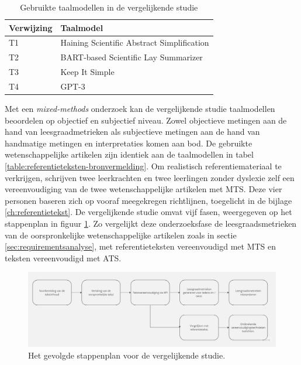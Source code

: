 \begin{center}
	\begin{table}[H]
		\begin{tabular}{ | m{4cm} | m{11cm} | } 
			\hline
			\textbf{Verwijzing} & \textbf{Taalmodel} \\
			\hline
			T1 & Haining Scientific Abstract Simplification \\
			\hline
			T2 & BART-based Scientific Lay Summarizer \\
			\hline
			T3 & Keep It Simple\\
			\hline
			T4 & GPT-3 \\
			\hline
		\end{tabular}
		\caption{Gebruikte taalmodellen in de vergelijkende studie}
		\label{table:vergelijkende-studie-taalmodellen}
	\end{table}
\end{center}

Met een \textit{mixed-methods} onderzoek kan de vergelijkende studie taalmodellen beoordelen op objectief en subjectief niveau. Zowel objectieve metingen aan de hand van leesgraadmetrieken als subjectieve metingen aan de hand van handmatige metingen en interpretaties komen aan bod. De gebruikte wetenschappelijke artikelen zijn identiek aan de taalmodellen in tabel \ref{table:referentieteksten-bronvermelding}. Om realistisch referentiemateriaal te verkrijgen, schrijven twee leerkrachten en twee leerlingen zonder dyslexie zelf een vereenvoudiging van de twee wetenschappelijke artikelen met MTS. Deze vier personen baseren zich op vooraf meegekregen richtlijnen, toegelicht in de bijlage \ref{ch:referentietekst}. De vergelijkende studie omvat vijf fasen, weergegeven op het stappenplan in figuur \ref{img:flowchart-vergelijkende-studie-metrics}. Zo vergelijkt deze onderzoeksfase de leesgraadsmetrieken van de oorspronkelijke wetenschappelijke artikelen zoals in sectie \ref{sec:requirementsanalyse}, met referentieteksten vereenvoudigd met MTS en teksten vereenvoudigd met ATS.

\begin{figure}
\includegraphics[width=\linewidth]{img/flowchart-vergelijkende-studie.jpg}
\caption{Het gevolgde stappenplan voor de vergelijkende studie.}
\label{img:flowchart-vergelijkende-studie-metrics}
\end{figure}

